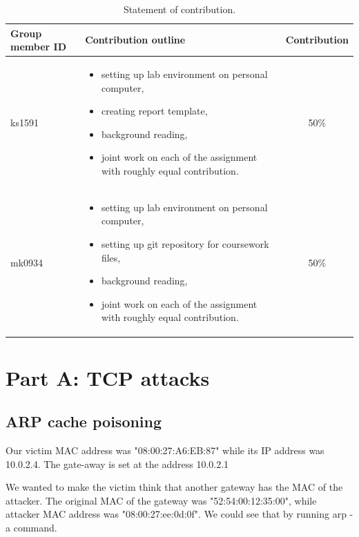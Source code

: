 \documentclass[12pt, a4paper, pdflatex]{article}
\begin{document}
\begin{center}
  \begin{table}[h]
    \begin{tabular}{ l | p{8.5cm} | c }
      Group member ID & Contribution outline & Contribution \\
      \hline
      ks1591 &
      \begin{itemize}
        \item setting up lab environment on personal computer,
        \item creating report template,
        \item background reading,
        \item joint work on each of the assignment with roughly equal contribution.
      \end{itemize}
      & 50\% \\
      mk0934 &
      \begin{itemize}
        \item setting up lab environment on personal computer,
        \item setting up git repository for coursework files,
        \item background reading,
        \item joint work on each of the assignment with roughly equal contribution.
      \end{itemize}
      & 50\% \\
    \end{tabular}
    \caption{Statement of contribution.\label{tab:SoC}}
  \end{table}
\end{center}

\newpage

\section{Part A: TCP attacks}

\subsection{ARP cache poisoning}\label{arp}

Our victim MAC address was "08:00:27:A6:EB:87" while its IP address was 10.0.2.4. The gate-away is set at the address 10.0.2.1 

We wanted to make the victim think that another gateway has the MAC of the attacker. The original MAC of the gateway was "52:54:00:12:35:00", while attacker MAC address was "08:00:27:ee:0d:0f". We could see that by running arp -a command.\\
\end{document}
